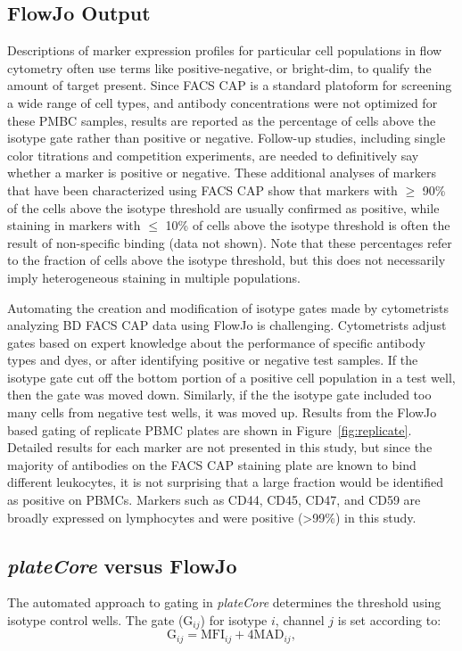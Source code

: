 \documentclass[12pt]{article}
\newcommand{\Rpackage}[1]{{\textit{#1}}}
\begin{document}
\subsection*{FlowJo Output}

Descriptions of marker expression profiles for particular cell populations in
flow cytometry often use terms like positive-negative, or bright-dim, to
qualify the amount of target present. Since FACS CAP is a
standard platoform for screening a wide range of cell types, and antibody
concentrations were not optimized for these PMBC samples, results are reported as
the percentage of cells above the isotype gate rather than positive or
negative. Follow-up studies, including single color titrations and competition
experiments, are needed to definitively say whether a marker is positive or
negative. These additional analyses of markers that have been characterized
using FACS CAP show that markers with $\ge$ 90\% of the cells above the isotype
threshold are usually confirmed as positive, while staining in markers with
$\le$ 10\% of cells above the isotype threshold is often the result of
non-specific binding (data not shown). Note that these percentages refer to the
fraction of cells above the isotype threshold, but this does not necessarily
imply heterogeneous staining in multiple populations.




Automating the creation and modification of isotype gates made by cytometrists
analyzing BD FACS CAP data using FlowJo is challenging. Cytometrists adjust
gates based on expert knowledge about the performance of specific antibody
types and dyes, or after identifying positive or negative test samples. If the
isotype gate cut off the bottom portion of a positive cell population in a test
well, then the gate was moved down.  Similarly, if the the isotype gate
included too many cells from negative test wells, it was moved up. Results from
the FlowJo based gating of replicate PBMC plates are shown in
Figure~\ref{fig:replicate}. Detailed results for each marker are not
presented in this study, but since the majority of antibodies on the FACS
CAP staining plate are known to bind different leukocytes, it is not surprising
that a large fraction would be identified as positive on PBMCs. Markers such as
CD44, CD45, CD47, and CD59 are broadly expressed on lymphocytes and were
positive (>99\%) in this study.

\subsection*{\Rpackage{plateCore} versus FlowJo}
The automated approach to gating in \Rpackage{plateCore} determines the
threshold using isotype control wells. The gate (G$_{ij}$) for isotype $i$,
channel $j$ is set according to:
\begin{equation}
\text{G}_{ij} = \text{MFI}_{ij} + 4 \text{MAD}_{ij},
\label{isoGate}
\end{equation}
\end{document}

